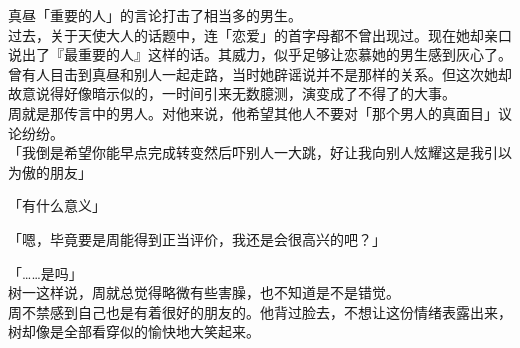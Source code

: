 真昼「重要的人」的言论打击了相当多的男生。\\

过去，关于天使大人的话题中，连「恋爱」的首字母都不曾出现过。现在她却亲口说出了『最重要的人』这样的话。其威力，似乎足够让恋慕她的男生感到灰心了。\\

曾有人目击到真昼和别人一起走路，当时她辟谣说并不是那样的关系。但这次她却故意说得好像暗示似的，一时间引来无数臆测，演变成了不得了的大事。\\

周就是那传言中的男人。对他来说，他希望其他人不要对「那个男人的真面目」议论纷纷。\\

「我倒是希望你能早点完成转变然后吓别人一大跳，好让我向别人炫耀这是我引以为傲的朋友」

「有什么意义」

「嗯，毕竟要是周能得到正当评价，我还是会很高兴的吧？」

「……是吗」\\

树一这样说，周就总觉得略微有些害臊，也不知道是不是错觉。\\

周不禁感到自己也是有着很好的朋友的。他背过脸去，不想让这份情绪表露出来，树却像是全部看穿似的愉快地大笑起来。
